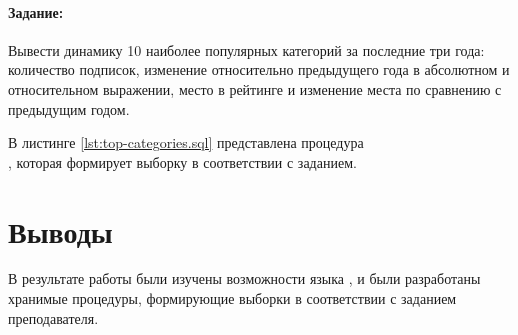 \paragraph{Задание:} Вывести динамику 10 наиболее популярных категорий за последние три года: количество подписок, изменение относительно предыдущего года в абсолютном и относительном выражении, место в рейтинге и изменение места по сравнению с предыдущим годом.

В листинге \ref{lst:top-categories.sql} представлена процедура\\ , которая формирует выборку в соответствии с заданием.


 
\section{Выводы}

В результате работы были изучены возможности языка , и были разработаны хранимые процедуры, формирующие выборки в соответствии с заданием преподавателя.


